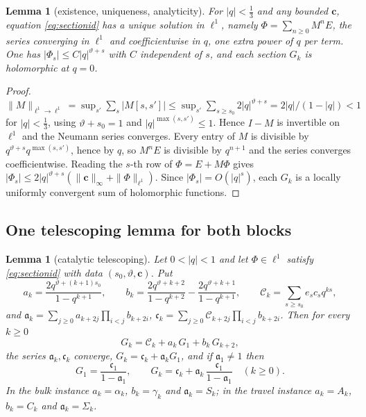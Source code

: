 \documentclass[11pt]{article}
\theoremstyle{plain}
\newtheorem{lemma}[theorem]{Lemma}
\theoremstyle{definition}
\theoremstyle{remark}
\begin{document}
\begin{lemma}[existence, uniqueness, analyticity]\label{lem:modelexist}
For $|q|<\tfrac13$ and any bounded $\mathbf c$, equation \eqref{eq:sectionid} has a unique solution
in $\ell^1$, namely $\Phi=\sum_{n\ge0}M^nE$, the series converging in $\ell^1$ and coefficientwise
in $q$, one extra power of $q$ per term. One has $|\Phi_s|\le C|q|^{\vartheta+s}$ with $C$
independent of $s$, and each section $G_k$ is holomorphic at $q=0$.
\end{lemma}

\begin{proof}
$\|M\|_{\ell^1\to\ell^1}=\sup_{s'}\sum_s|M[s,s']|\le\sup_{s'}\sum_{s\ge s_0}2|q|^{\vartheta+s}
=2|q|/(1-|q|)<1$ for $|q|<\tfrac13$, using $\vartheta+s_0=1$ and $|q|^{\max(s,s')}\le1$. Hence
$I-M$ is invertible on $\ell^1$ and the Neumann series converges. Every entry of $M$ is divisible
by $q^{\vartheta+s}q^{\max(s,s')}$, hence by $q$, so $M^nE$ is divisible by $q^{n+1}$ and the
series converges coefficientwise. Reading the $s$-th row of $\Phi=E+M\Phi$ gives
$|\Phi_s|\le2|q|^{\vartheta+s}(\|\mathbf c\|_\infty+\|\Phi\|_{\ell^1})$. Since
$|\Phi_s|=O(|q|^{s})$, each $G_k$ is a locally uniformly convergent sum of holomorphic functions.
\end{proof}

\subsection{One telescoping lemma for both blocks}\label{sec:tel}

\begin{lemma}[catalytic telescoping]\label{lem:tel}
Let $0<|q|<1$ and let $\Phi\in\ell^1$ satisfy \eqref{eq:sectionid} with data
$(s_0,\vartheta,\mathbf c)$. Put
\[
  a_k=\frac{2q^{\vartheta+(k+1)s_0}}{1-q^{k+1}},\qquad
  b_k=\frac{2q^{\vartheta+k+2}}{1-q^{k+2}}-\frac{2q^{\vartheta+k+1}}{1-q^{k+1}},\qquad
  \mathcal C_k=\sum_{s\ge s_0}e_sc_sq^{ks},
\]
and $\mathfrak a_k=\sum_{j\ge0}a_{k+2j}\prod_{i<j}b_{k+2i}$,
$\mathfrak c_k=\sum_{j\ge0}\mathcal C_{k+2j}\prod_{i<j}b_{k+2i}$. Then for every $k\ge0$
\begin{equation}\label{eq:threeterm}
   G_k=\mathcal C_k+a_k\,G_1+b_k\,G_{k+2},
\end{equation}
the series $\mathfrak a_k,\mathfrak c_k$ converge, $G_k=\mathfrak c_k+\mathfrak a_kG_1$, and if
$\mathfrak a_1\ne1$ then
\begin{equation}\label{eq:solved}
   G_1=\frac{\mathfrak c_1}{1-\mathfrak a_1},\qquad
   G_k=\mathfrak c_k+\mathfrak a_k\,\frac{\mathfrak c_1}{1-\mathfrak a_1}\quad(k\ge0).
\end{equation}
In the bulk instance $a_k=\alpha_k$, $b_k=\gamma_k$ and $\mathfrak a_k=S_k$; in the travel
instance $a_k=A_k$, $b_k=C_k$ and $\mathfrak a_k=\Sigma_k$.
\end{lemma}
\end{document}
